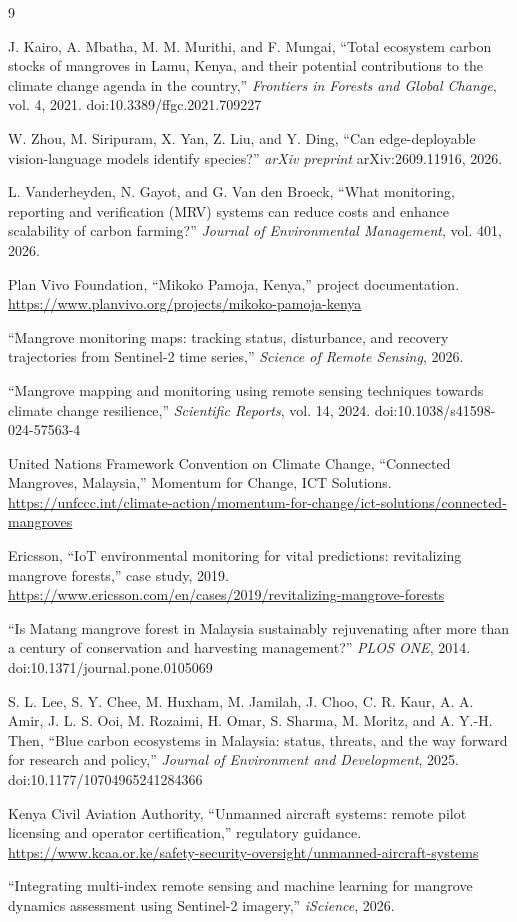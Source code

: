 \documentclass[10pt,twocolumn,a4paper]{article}
\begin{document}
\begin{thebibliography}{9}
\small

J. Kairo, A. Mbatha, M. M. Murithi, and F. Mungai,
``Total ecosystem carbon stocks of mangroves in Lamu, Kenya, and their potential
contributions to the climate change agenda in the country,''
\emph{Frontiers in Forests and Global Change}, vol. 4, 2021.
doi:10.3389/ffgc.2021.709227

W. Zhou, M. Siripuram, X. Yan, Z. Liu, and Y. Ding,
``Can edge-deployable vision-language models identify species?''
\emph{arXiv preprint} arXiv:2609.11916, 2026.

L. Vanderheyden, N. Gayot, and G. Van den Broeck,
``What monitoring, reporting and verification (MRV) systems can reduce costs and
enhance scalability of carbon farming?''
\emph{Journal of Environmental Management}, vol. 401, 2026.

Plan Vivo Foundation,
``Mikoko Pamoja, Kenya,'' project documentation.
\url{https://www.planvivo.org/projects/mikoko-pamoja-kenya}

``Mangrove monitoring maps: tracking status, disturbance, and recovery
trajectories from Sentinel-2 time series,''
\emph{Science of Remote Sensing}, 2026.

``Mangrove mapping and monitoring using remote sensing techniques towards
climate change resilience,''
\emph{Scientific Reports}, vol. 14, 2024.
doi:10.1038/s41598-024-57563-4

United Nations Framework Convention on Climate Change,
``Connected Mangroves, Malaysia,'' Momentum for Change, ICT Solutions.
\url{https://unfccc.int/climate-action/momentum-for-change/ict-solutions/connected-mangroves}

Ericsson,
``IoT environmental monitoring for vital predictions: revitalizing mangrove
forests,'' case study, 2019.
\url{https://www.ericsson.com/en/cases/2019/revitalizing-mangrove-forests}

``Is Matang mangrove forest in Malaysia sustainably rejuvenating after more than
a century of conservation and harvesting management?''
\emph{PLOS ONE}, 2014. doi:10.1371/journal.pone.0105069

S. L. Lee, S. Y. Chee, M. Huxham, M. Jamilah, J. Choo, C. R. Kaur,
A. A. Amir, J. L. S. Ooi, M. Rozaimi, H. Omar, S. Sharma, M. Moritz,
and A. Y.-H. Then,
``Blue carbon ecosystems in Malaysia: status, threats, and the way forward for
research and policy,''
\emph{Journal of Environment and Development}, 2025.
doi:10.1177/10704965241284366

Kenya Civil Aviation Authority,
``Unmanned aircraft systems: remote pilot licensing and operator certification,''
regulatory guidance.
\url{https://www.kcaa.or.ke/safety-security-oversight/unmanned-aircraft-systems}

``Integrating multi-index remote sensing and machine learning for mangrove
dynamics assessment using Sentinel-2 imagery,''
\emph{iScience}, 2026.

\end{thebibliography}
\end{document}

